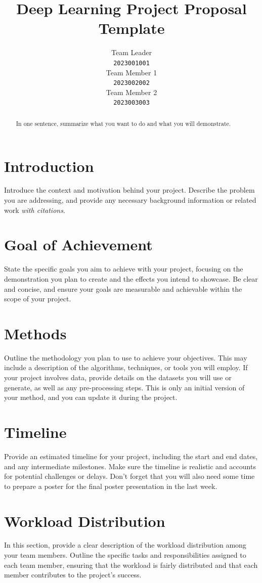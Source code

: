 \documentclass{article}
\title{Deep Learning Project Proposal Template}
\author{%
  Team Leader \\
  \texttt{2023001001} \\
  \And
  Team Member 1 \\
  \texttt{2023002002} \\
  \And
  Team Member 2 \\
  \texttt{2023003003} \\
}
\begin{document}
\maketitle

\begin{abstract}
  In one sentence, summarize what you want to do and what you will demonstrate.
\end{abstract}

\section{Introduction}
Introduce the context and motivation behind your project. Describe the problem you are addressing, and provide any necessary background information or related work \textit{with citations}.

\section{Goal of Achievement}
State the specific goals you aim to achieve with your project, focusing on the demonstration you plan to create and the effects you intend to showcase. Be clear and concise, and ensure your goals are measurable and achievable within the scope of your project.

\section{Methods}
Outline the methodology you plan to use to achieve your objectives. This may include a description of the algorithms, techniques, or tools you will employ. If your project involves data, provide details on the datasets you will use or generate, as well as any pre-processing steps. This is only an initial version of your method, and you can update it during the project.

\section{Timeline}
Provide an estimated timeline for your project, including the start and end dates, and any intermediate milestones. Make sure the timeline is realistic and accounts for potential challenges or delays. Don't forget that you will also need some time to prepare a poster for the final poster presentation in the last week.

\section{Workload Distribution}
In this section, provide a clear description of the workload distribution among your team members. Outline the specific tasks and responsibilities assigned to each team member, ensuring that the workload is fairly distributed and that each member contributes to the project's success.



\end{document}
